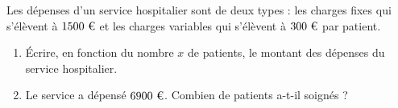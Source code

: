 \begin{exo}{}
	Les dépenses d'un service hospitalier sont de deux types : les charges fixes qui s'élèvent à $1500\text{ \texteuro}$ et les charges variables qui s'élèvent à $300\text{ \texteuro}$ par patient.
	\begin{enumerate}
		\item Écrire, en fonction du nombre $x$ de patients, le montant des dépenses du service hospitalier.
		\item Le service a dépensé $6900\text{ \texteuro}$. Combien de patients a-t-il soignés ?
	\end{enumerate}
\end{exo}
